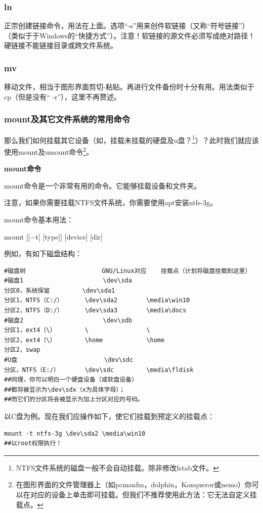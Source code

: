 \documentclass{book}
\begin{document}
\subsubsection{ln}
\cite{ln}\par
正宗创建链接命令，用法在上面。选项“-s”用来创件软链接（又称“符号链接”）（类似于于Windows的“快捷方式”）。注意！软链接的源文件必须写成绝对路径！硬链接不能链接目录或跨文件系统。
\subsubsection{mv}
移动文件，相当于图形界面剪切-粘贴。再进行文件备份时十分有用。用法类似于cp（但是没有“ -r”），这里不再赘述。
\subsubsection{mount及其它文件系统的常用命令}
那么我们如何挂载其它设备（如，挂载未挂载的硬盘及u盘？\footnote{NTFS文件系统的磁盘一般不会自动挂载。除非修改fstab文件。}）？此时我们就应该使用mount及umount命令\footnote{在图形界面的文件管理器上（如pcmanfm，dolphin，Konqueror或nemo）你可以在对应的设备上单击即可挂载。但我们不推荐使用此方法：它无法自定义挂载点。}。\par
\Large \textbf{mount命令} \normalsize \par
\cite{manmnt}\par
mount命令是一个非常有用的命令。它能够挂载设备和文件夹。\par
注意，如果你需要挂载NTFS文件系统，你需要使用apt安装ntfs-3g。\par
mount命令基本用法：\par
mount [[−t] [type]] [device] [dir]\par
例如，有如下磁盘结构：
\begin{verbatim}
#磁盘树                     GNU/Linux对应    挂载点（计划将磁盘挂载到这里）
#磁盘1                      \dev\sda
分区0，系统保留         \dev\sda1
分区1，NTFS（C:/）      \dev\sda2        \media\win10
分区2，NTFS（D:/）      \dev\sda3        \media\docs
#磁盘2                      \dev\sdb
分区1，ext4（\）        \                \
分区2，ext4（\）        \home            \home
分区2，swap
#U盘                        \dev\sdc
分区，NTFS（E:/）       \dev\sdc         \media\fldisk
##同理，你可以明白一个硬盘设备（或软盘设备）
##都将被显示为\dev\sdx（x为具体字母）；
##而它们的分区将会被显示为加上分区对应的号码。
\end{verbatim}
以C盘为例。现在我们应操作如下，使它们挂载到预定义的挂载点：
\begin{verbatim}
mount -t ntfs-3g \dev\sda2 \media\win10
##以root权限执行！
\end{verbatim}
\end{document}
